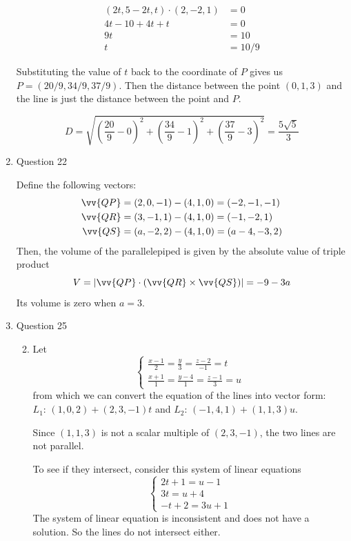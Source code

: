 \documentclass[11pt]{article}
\begin{document}
\begin{enumerate}
    \begin{align*}
        (2t,5-2t,t) \cdot (2,-2,1) &= 0 \\
        4t-10+4t+t &= 0 \\
        9t &= 10 \\
        t &= 10/9
    \end{align*}
    
    Substituting the value of $t$ back to the coordinate of $P$ gives us $P=(20/9,34/9,37/9)$. Then the distance between the point $(0,1,3)$ and the line is just the distance between the point and $P$.
    
    $$
    D=\sqrt{(\frac{20}{9}-0)^2 + (\frac{34}{9}-1)^2 + (\frac{37}{9}-3)^2} = \frac{5\sqrt{5}}{3}
    $$
    
    \item Question 22
    
    Define the following vectors:
    \begin{align*}
        \vv{QP}&= (2,0,-1)-(4,1,0) = (-2,-1,-1) \\ \vv{QR}&=(3,-1,1)-(4,1,0) = (-1,-2,1) \\ \vv{QS}&=(a,-2,2)-(4,1,0) = (a-4,-3,2)
    \end{align*}
    Then, the volume of the parallelepiped is given by the absolute value of triple product
    $$
    V=|\vv{QP} \cdot (\vv{QR}\times\vv{QS})|=-9-3a
    $$
    Its volume is zero when $a=3$.
    \item Question 25
    \begin{enumerate}
        \setcounter{enumii}{1}
        \item 
        Let
        $$
        \begin{cases}
        \frac{x-1}{2}=\frac{y}{3}=\frac{z-2}{-1} = t \\
        \frac{x+1}{1}=\frac{y-4}{1}=\frac{z-1}{3} = u
        \end{cases}
        $$
        from which we can convert the equation of the lines into vector form: $L_1:\, (1,0,2)+(2,3,-1)t$ and $L_2:\, (-1,4,1)+(1,1,3)u$.
        
        Since $(1,1,3)$ is not a scalar multiple of $(2,3,-1)$, the two lines are not parallel.
        
        To see if they intersect, consider this system of linear equations
        $$
        \begin{cases}
        2t+1=u-1 \\
        3t=u+4 \\
        -t+2=3u+1
        \end{cases}
        $$
        The system of linear equation is inconsistent and does not have a solution. So the lines do not intersect either.
        

\end{enumerate}
\end{enumerate}
\end{document}
